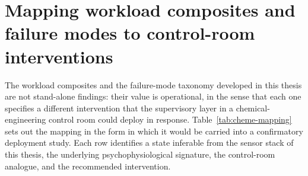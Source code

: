 \section{Mapping workload composites and failure modes to control-room interventions}\label{sec:cheme-mapping}

The workload composites and the failure-mode taxonomy developed in this thesis are not stand-alone findings: their value is operational, in the sense that each one specifies a different intervention that the supervisory layer in a chemical-engineering control room could deploy in response. Table~\ref{tab:cheme-mapping} sets out the mapping in the form in which it would be carried into a confirmatory deployment study. Each row identifies a state inferable from the sensor stack of this thesis, the underlying psychophysiological signature, the control-room analogue, and the recommended intervention.


